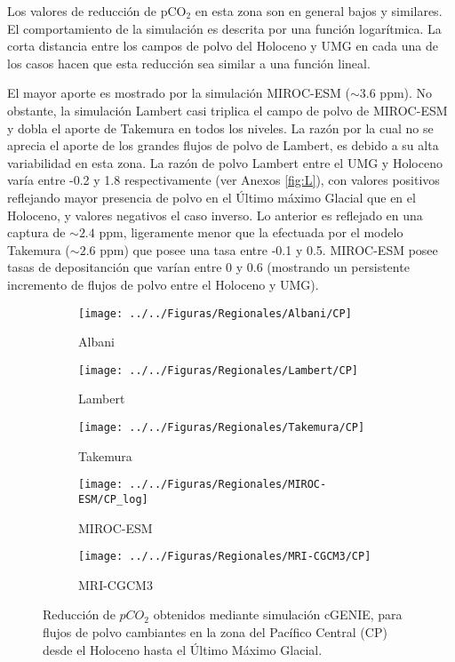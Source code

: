 Los valores de reducción de pCO$_2$ en esta zona son en general bajos y similares. El comportamiento de la simulación es descrita por una función logarítmica. La corta distancia entre los campos de polvo del Holoceno y UMG en cada una de los casos hacen que esta reducción sea similar a una función lineal.  

El mayor aporte es mostrado por la simulación MIROC-ESM ($\sim 3.6$ ppm). No obstante, la simulación Lambert casi triplica el campo de polvo de MIROC-ESM y dobla el aporte de Takemura en todos los niveles. La razón por la cual no se aprecia el aporte de los grandes flujos de polvo de Lambert, es debido a su alta variabilidad en esta zona. La razón de polvo Lambert entre el UMG y Holoceno varía entre -0.2 y 1.8 respectivamente (ver Anexos \ref{fig:L}), con valores positivos reflejando mayor presencia de polvo en el Último máximo Glacial que en el Holoceno, y valores negativos el caso inverso. Lo anterior es reflejado en una captura de $\sim 2.4$ ppm, ligeramente menor que la efectuada por el modelo Takemura ($\sim 2.6$ ppm) que posee una tasa entre -0.1 y 0.5. MIROC-ESM posee tasas de depositanción que varían entre 0 y 0.6 (mostrando un persistente incremento de flujos de polvo entre el Holoceno y UMG).  \newpage

 \begin{figure}[H]
        \begin{subfigure}[b]{0.5\textwidth}
                \texttt{[image: ../../Figuras/Regionales/Albani/CP]}
                \caption{Albani}
                \label{fig:L_R_CP}
        \end{subfigure}%
        \begin{subfigure}[b]{0.5\textwidth}
                \texttt{[image: ../../Figuras/Regionales/Lambert/CP]}
                \caption{Lambert}
                \label{fig:A_R_CP}
        \end{subfigure}%
        
        \begin{subfigure}[b]{0.5\textwidth}
                \texttt{[image: ../../Figuras/Regionales/Takemura/CP]}
                \caption{Takemura}
                \label{fig:T_R_CP}
        \end{subfigure}%
        \begin{subfigure}[b]{0.5\textwidth}
                \texttt{[image: ../../Figuras/Regionales/MIROC-ESM/CP\_log]}
                \caption{MIROC-ESM}
                \label{fig:MI_R_CP}
        \end{subfigure}
        
        \begin{subfigure}[b]{0.5\textwidth}
                \texttt{[image: ../../Figuras/Regionales/MRI-CGCM3/CP]}
                \caption{MRI-CGCM3}
                \label{fig:MR_R_CP}
        \end{subfigure}
        \caption[Series de reducci\'on de $pCO_2$ de flujos regionales de polvo (CP)]{Reducci\'on de $pCO_2$ obtenidos mediante simulaci\'on cGENIE, para flujos de polvo cambiantes en la zona del Pacífico Central (CP) desde el Holoceno hasta el \'Ultimo M\'aximo Glacial.}\label{fig:CP}
\end{figure}

